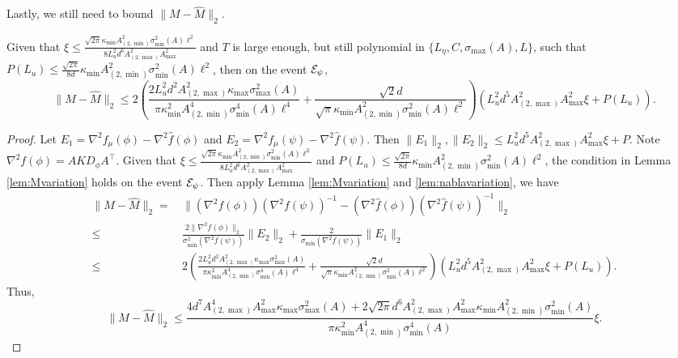 Lastly, we still need to bound $\|M - \hat{M}\|_2$.
\begin{lemma}
\label{lem:Mvariation_alg}
Given that  $\xi \le  \frac{\sqrt{2\pi}\kappa_{\min}A^2_{(2,\min)}\sigma_{\min}^2(A)\ell^2}{8L_u^2d^6 A_{(2,\max)}^2A_{\max}^2}$ and $T$  is large enough, but still polynomial in $\{L_\eta, C, \sigma_{\max}(A), L\}$, such that $P(L_u) \le \frac{\sqrt{2\pi}}{8d}\kappa_{\min}A^2_{(2,\min)}\sigma_{\min}^2(A)\ell^2$, then on the event $\mathcal{E}_{\psi}$, 
\[ 
\|M - \hat{M}\|_2 \le 2\left( \frac{2L_u^2d^2A_{(2,\max)}^2\kappa_{\max}\sigma_{\max}^2(A)}{\pi\kappa^2_{\min}A^4_{(2,\min)}\sigma_{\min}^4(A)\ell^4} + 
\frac{\sqrt{2}d}{\sqrt{\pi}\kappa_{\min}A^2_{(2,\min)}\sigma_{\min}^2(A)\ell^2}
\right)\left(L_u^2d^5 A_{(2,\max)}^2A_{\max}^2\xi + P(L_u)\right).
\]
\end{lemma}
\begin{proof}
Let $E_1 = \nabla^2 f_{\mu}(\phi) - \nabla^2 \hat{f}(\phi)$ and $ E_2 = \nabla^2 f_{\mu}(\psi) - \nabla^2 \hat{f}(\psi)$. Then $\|E_1\|_2 , \|E_2\|_2 \le L_u^2d^5 A_{(2,\max)}^2A_{\max}^2\xi + P$.
Note $\nabla^2f(\phi) = AKD_{\phi} A^{\top}$.
Given that 
$\xi \le  \frac{\sqrt{2\pi}\kappa_{\min}A^2_{(2,\min)}\sigma_{\min}^2(A)\ell^2}{8L_u^2d^6 A_{(2,\max)}^2A_{\max}^2}$ 
and $P(L_u) \le \frac{\sqrt{2\pi}}{8d}\kappa_{\min}A^2_{(2,\min)}\sigma_{\min}^2(A)\ell^2$, the condition in Lemma \ref{lem:Mvariation} holds on the event $\mathcal{E}_{\psi}$. 
Then apply Lemma \ref{lem:Mvariation} and \ref{lem:nablavariation}, we have
\begin{align*}
\|M - \hat{M}\|_2 =\, & \|(\nabla^2 f(\phi))(\nabla^2f(\psi))^{-1} - (\nabla^2 \hat{f}(\phi))(\nabla^2\hat{f}(\psi))^{-1} \|_2 \\
\le \, &\frac{2\|\nabla^2 f(\phi)\|_2}{\sigma_{\min}^2(\nabla^2f(\psi))}\|E_2\|_2 + \frac{2}{\sigma_{\min}(\nabla^2f(\psi))}\|E_1\|_2 \\
\le \, & 2\left( \frac{2L_u^2d^2A_{(2,\max)}^2\kappa_{\max}\sigma_{\max}^2(A)}{\pi\kappa^2_{\min}A^4_{(2,\min)}\sigma_{\min}^4(A)\ell^4} + 
\frac{\sqrt{2}d}{\sqrt{\pi}\kappa_{\min}A^2_{(2,\min)}\sigma_{\min}^2(A)\ell^2}
\right)\left(L_u^2d^5 A_{(2,\max)}^2A_{\max}^2\xi + P(L_u)\right).
\end{align*}
Thus, 
\[ 
\|M - \hat{M}\|_2 \le \frac{4d^7A_{(2,\max)}^4A_{\max}^2\kappa_{\max}\sigma_{\max}^2(A) + 2\sqrt{2\pi}d^6A_{(2,\max)}^2A_{\max}^2\kappa_{\min}A^2_{(2,\min)}\sigma_{\min}^2(A)}{\pi\kappa^2_{\min}A^4_{(2,\min)}\sigma_{\min}^4(A)} \xi.
\]
\fi
\end{proof}
